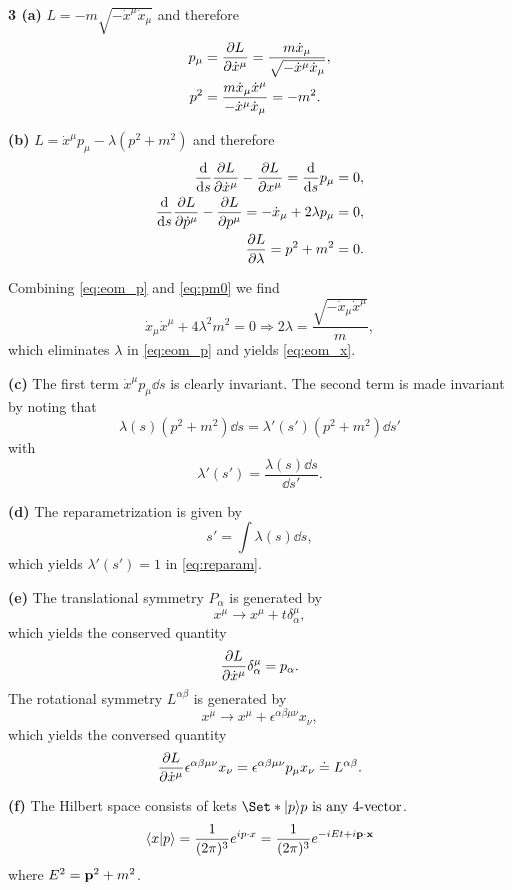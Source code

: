 \documentclass{article}
\makeatletter
\newcommand*{\shifttext}[1]{%
  \settowidth{\@tempdima}{#1}%
  \hspace{-\@tempdima}#1%
}
\newcommand{\plabel}[1]{%
\shifttext{\textbf{#1}\quad}%
}
\newcommand{\prule}{%
\begin{center}%
\hdashrule[0.5ex]{.99\linewidth}{1pt}{1pt 2.5pt}%
\end{center}%
}
\makeatother
\begin{document}
\prule

\plabel{3 (a)}%
$L = -m \sqrt{-\dot{x}^\mu \dot{x}_\mu}$ and therefore
\begin{align}
    \label{eq:eom_x} p_\mu &= \pdv{L}{\dot{x}^\mu} = \frac{m\dot{x}_\mu}{\sqrt{-\dot{x}^\mu \dot{x}_\mu}}, \\
    \notag p^2 &= \frac{m\dot{x}_\mu\dot{x}^\mu }{{-\dot{x}^\mu \dot{x}_\mu}} = -m^2.
\end{align}

\plabel{(b)}%
$L = \dot{x}^\mu p_\mu - \lambda (p^2+m^2)$ and therefore
\begin{align}
    \notag \dv{}{s}\pdv{L}{\dot{x}^\mu} - \pdv{L}{x^\mu} = \dv{}{s}p_\mu &= 0, \\
    \label{eq:eom_p}\dv{}{s}\pdv{L}{\dot{p}^\mu} - \pdv{L}{p^\mu} = -\dot{x}_\mu + 2\lambda p_\mu &= 0, \\
    \label{eq:pm0} \pdv{L}{\lambda} = p^2 + m^2 &= 0.
\end{align}

Combining \cref{eq:eom_p} and \cref{eq:pm0} we find
\[\dot{x}_\mu \dot{x}^\mu + 4\lambda^2 m^2 = 0 \Rightarrow 2\lambda = \frac{\sqrt{-\dot{x}_\mu \dot{x}^\mu}}{m}, \]
which eliminates $\lambda$ in \cref{eq:eom_p} and yields \cref{eq:eom_x}.

\plabel{(c)}%
The first term $\dot{x}^\mu p_\mu \dd{s}$ is clearly invariant.
The second term is made invariant by noting that
\[ \lambda(s) (p^2 + m^2) \dd{s} = \lambda'(s') (p^2 + m^2) \dd{s'} \]
with
\begin{equation}
    \label{eq:reparam} \lambda'(s') = \frac{\lambda(s) \dd{s}}{\dd{s'}}.
\end{equation}

\plabel{(d)}%
The reparametrization is given by
\[ s' = \int \lambda(s) \dd{s}, \]
which yields $\lambda'(s') = 1$ in \eqref{eq:reparam}.

\plabel{(e)}%
The translational symmetry $P_\alpha$ is generated by
\[ x^\mu \rightarrow x^\mu + t \delta^\mu_\alpha, \]
which yields the conserved quantity
\[ \pdv{L}{\dot{x}^\mu} \delta^\mu_\alpha = p_\alpha. \]
The rotational symmetry $L^{\alpha\beta}$ is generated by
\[ x^\mu \rightarrow x^\mu + \epsilon^{\alpha\beta\mu\nu} x_\nu, \]
which yields the conversed quantity
\[ \pdv{L}{\dot{x}^\mu} \epsilon^{\alpha\beta\mu\nu} x_\nu = \epsilon^{\alpha\beta\mu\nu}p_\mu x_\nu \doteq L^{\alpha\beta}. \]

\plabel{(f)}%
The Hilbert space consists of kets $\Set*{\ket{p}}{p \text{ is any 4-vector}}$.
\[ \bra{x}\ket{p} = \frac{1}{(2\pi)^3} e^{ip \cdot x} = \frac{1}{(2\pi)^3} e^{-iEt + i\vb{p}\cdot \vb{x}} \]
where $E^2 = \vb{p}^2 + m^2$.
\end{document}
